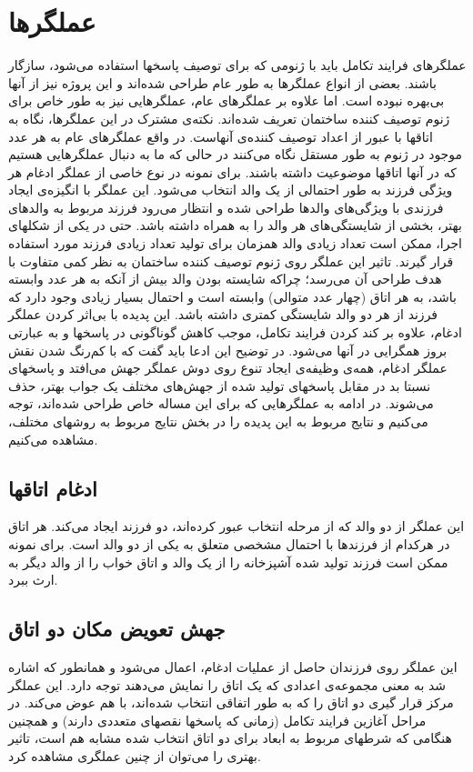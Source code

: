 \documentclass{report}
\begin{document}
\section{عملگرها}
عملگرهای فرایند تکامل باید با ژنومی که برای توصیف پاسخها استفاده می‌شود، سازگار باشند. بعضی از انواع عملگرها به طور عام طراحی شده‌اند و این پروژه نیز از آنها بی‌بهره نبوده است. اما علاوه بر عملگرهای عام، عملگرهایی نیز به طور خاص برای ژنوم توصیف کننده ساختمان تعریف شده‌اند. نکته‌ی مشترک در این عملگرها، نگاه به اتاقها با عبور از اعداد توصیف کننده‌ی آنهاست. در واقع عملگرهای عام به هر عدد موجود در ژنوم به طور مستقل نگاه می‌کنند در حالی که ما به دنبال عملگرهایی هستیم که در آنها اتاقها موضوعیت داشته باشند.
برای نمونه در نوع خاصی از عملگر ادغام هر ویژگی فرزند به طور احتمالی از یک والد انتخاب می‌شود. این عملگر با انگیزه‌ی ایجاد فرزندی با ویژگی‌های والدها طراحی شده و انتظار می‌رود فرزند مربوط به والدهای بهتر، بخشی از شایستگی‌های هر والد را به همراه داشته باشد. حتی در یکی از شکلهای اجرا، ممکن است تعداد زیادی والد همزمان برای تولید تعداد زیادی فرزند مورد استفاده قرار گیرند. تاثیر این عملگر روی ژنوم توصیف کننده ساختمان به نظر کمی متفاوت با هدف طراحی آن می‌رسد؛ چراکه شایسته بودن والد بیش از آنکه به هر عدد وابسته باشد، به هر اتاق (چهار عدد متوالی) وابسته است و احتمال بسیار زیادی وجود دارد که فرزند از هر دو والد شایستگی کمتری داشته باشد. این پدیده با بی‌اثر کردن عملگر ادغام، علاوه بر کند کردن فرایند تکامل، موجب کاهش گوناگونی در پاسخها و به عبارتی بروز همگرایی در آنها می‌شود. در توضیح این ادعا باید گفت که با کم‌رنگ شدن نقش عملگر ادغام، همه‌ی وظیفه‌ی ایجاد تنوع روی دوش عملگر جهش می‌افتد و پاسخهای نسبتا بد در مقابل پاسخهای تولید شده از جهش‌های مختلف یک جواب بهتر، حذف می‌شوند. در ادامه به عملگرهایی که برای این مساله خاص طراحی شده‌اند، توجه می‌کنیم و نتایج مربوط به این پدیده را در بخش نتایج مربوط به روشهای مختلف، مشاهده می‌کنیم.

\subsection{ادغام اتاقها}
این عملگر از دو والد که از مرحله انتخاب عبور کرده‌اند، دو فرزند ایجاد می‌کند. هر اتاق در هرکدام از فرزندها با احتمال مشخصی متعلق به یکی از دو والد است. برای نمونه ممکن است فرزند تولید شده آشپزخانه را از یک والد و اتاق خواب را از والد دیگر به ارث ببرد.

\subsection{جهش تعویض مکان دو اتاق}
این عملگر روی فرزندان حاصل از عملیات ادغام، اعمال می‌شود و همانطور که اشاره شد به معنی مجموعه‌ی اعدادی که یک اتاق را نمایش می‌دهند توجه دارد. این عملگر مرکز قرار گیری دو اتاق را که به طور اتفاقی انتخاب شده‌اند، با هم عوض می‌کند. در مراحل آغازین فرایند تکامل (زمانی که پاسخها نقصهای متعددی دارند) و همچنین هنگامی که شرطهای مربوط به ابعاد برای دو اتاق انتخاب شده مشابه هم است، تاثیر بهتری را می‌توان از چنین عملگری مشاهده کرد. 
\end{document}
